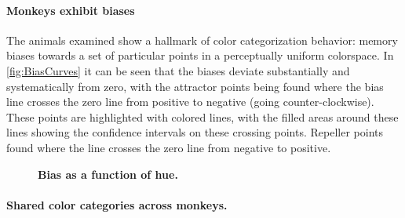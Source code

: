 
\paragraph{Monkeys exhibit biases} %

The animals examined show a hallmark of color categorization behavior: memory biases towards a set of particular points in a perceptually uniform colorspace.
In \autoref{fig:BiasCurves} it can be seen that the biases deviate substantially and systematically from zero, with the attractor points being found where the bias line crosses the zero line from positive to negative (going counter-clockwise). These points are highlighted with colored lines, with the filled areas around these lines showing the confidence intervals on these crossing points. Repeller points found where the line crosses the zero line from negative to positive.

\begin{figure}

\caption{\textbf{Bias as a function of hue.} 
}
\label{fig:BiasCurves}
\end{figure}


\paragraph{Shared color categories across monkeys.}

